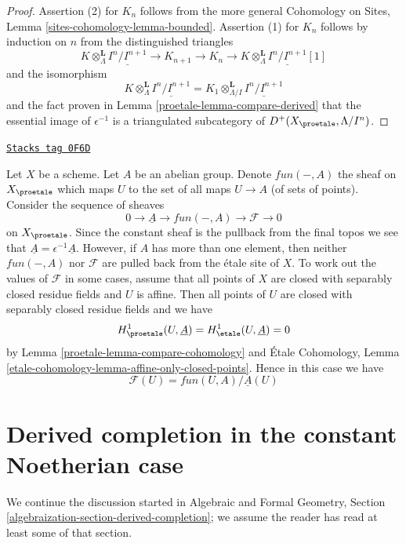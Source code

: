 \begin{proof}

Assertion (2) for $K_n$ follows from the more general
Cohomology on Sites, Lemma \ref{sites-cohomology-lemma-bounded}.
Assertion (1) for $K_n$ follows by induction on $n$ from the
distinguished triangles
$$
K \otimes_\Lambda^\mathbf{L} \underline{I^n/I^{n + 1}} \to
K_{n + 1} \to
K_n \to
K \otimes_\Lambda^\mathbf{L} \underline{I^n/I^{n + 1}}[1]
$$
and the isomorphism
$$
K \otimes_\Lambda^\mathbf{L} \underline{I^n/I^{n + 1}} =
K_1 \otimes_{\Lambda/I}^\mathbf{L} \underline{I^n/I^{n + 1}}
$$
and the fact proven in Lemma \ref{proetale-lemma-compare-derived}
that the essential image of $\epsilon^{-1}$ is a triangulated
subcategory of $D^+(X_\proetale, \Lambda/I^n)$.
\end{proof}

\begin{example}
\label{proetale-example-functions-mod-locally-constant-functions}
\href{https://stacks.math.columbia.edu/tag/0F6D}{\texttt{Stacks tag 0F6D}}

Let $X$ be a scheme. Let $A$ be an abelian group. Denote
$fun(-, A)$ the sheaf on $X_\proetale$ which maps $U$
to the set of all maps $U \to A$ (of sets of points).
Consider the sequence of sheaves
$$
0 \to \underline{A} \to fun(-, A) \to \mathcal{F} \to 0
$$
on $X_\proetale$. Since the constant sheaf is the pullback from the final
topos we see that $\underline{A} = \epsilon^{-1}\underline{A}$.
However, if $A$ has more than one element, then neither $fun(-, A)$
nor $\mathcal{F}$ are pulled back from the \'etale site of $X$.
To work out the values of $\mathcal{F}$ in some cases, assume that
all points of $X$ are closed with separably closed residue fields
and $U$ is affine. Then all points of $U$ are closed with separably
closed residue fields and we have
$$
H^1_\proetale(U, \underline{A}) =
H^1_\etale(U, \underline{A}) = 0
$$
by Lemma \ref{proetale-lemma-compare-cohomology} and
\'Etale Cohomology, Lemma
\ref{etale-cohomology-lemma-affine-only-closed-points}.
Hence in this case we have
$$
\mathcal{F}(U) = fun(U, A)/\underline{A}(U)
$$
\end{example}

\section{Derived completion in the constant Noetherian case}
\label{proetale-section-derived-completion-noetherian}
We continue the discussion started in Algebraic and Formal Geometry, Section
\ref{algebraization-section-derived-completion};
we assume the reader has read at least some of that section.

